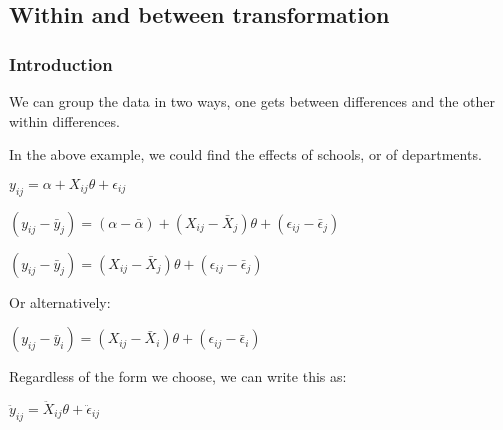 
\subsection{Within and between transformation}

\subsubsection{Introduction}

We can group the data in two ways, one gets between differences and the other within differences.

In the above example, we could find the effects of schools, or of departments.

\(y_{ij}=\alpha + X_{ij}\theta +\epsilon_{ij}\)

\((y_{ij}-\bar y_{j})=(\alpha -\bar \alpha )+(X_{ij}-\bar X_{j})\theta  +(\epsilon_{ij}-\bar \epsilon_{j})\)

\((y_{ij}-\bar y_{j})=(X_{ij}-\bar X_{j})\theta  +(\epsilon_{ij}-\bar \epsilon_{j})\)

Or alternatively:

\((y_{ij}-\bar y_{i})=(X_{ij}-\bar X_{i})\theta  +(\epsilon_{ij}-\bar \epsilon_{i})\)

Regardless of the form we choose, we can write this as:	

\(\ddot y_{ij}=\ddot X_{ij}\theta +\ddot \epsilon_{ij}\)


